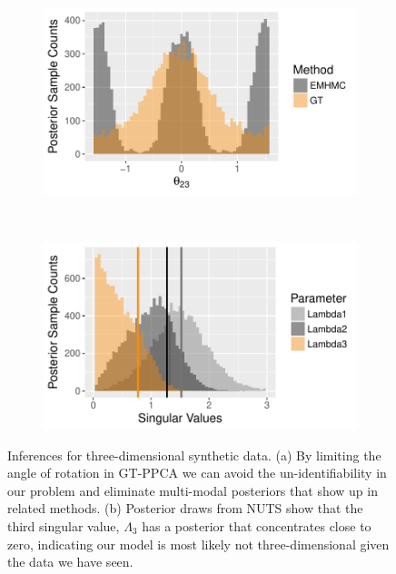 \documentclass{article}
\begin{document}
\begin{figure}
    \centering
    \begin{subfigure}[b]{0.38\textwidth}
        \includegraphics[width=\textwidth]{multiModal.pdf}
        \caption{}
        \label{fig:multiModal}
    \end{subfigure}
    ~ %
    \begin{subfigure}[b]{0.38\textwidth}
        \includegraphics[width=\textwidth]{syntheticLambdaPosterior.pdf}
        \caption{}
        \label{fig:SyntheticPosteriorEstimates}
    \end{subfigure}
    \caption{Inferences for three-dimensional synthetic data. (a) By limiting the angle of rotation in GT-PPCA we can avoid the un-identifiability in our problem and eliminate multi-modal posteriors that show up in related methods. (b) Posterior draws from NUTS show that the third singular value, $\Lambda_3$ has a posterior that concentrates close to zero, indicating our model is most likely not three-dimensional given the data we have seen.}
\end{figure}
\end{document}
